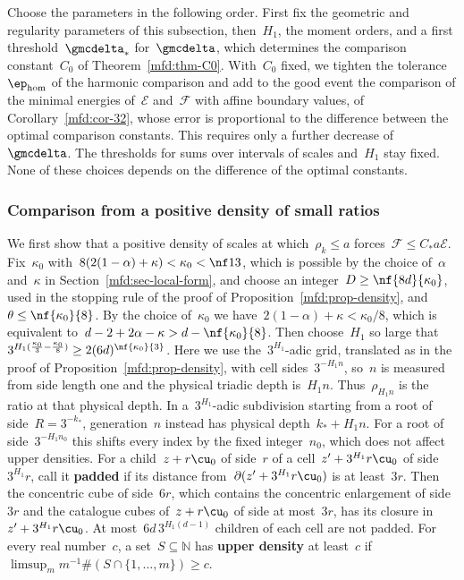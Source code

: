\documentclass[11pt]{amsart}
\begin{document}
\smallskip

Choose the parameters in the following order. First fix the geometric and regularity parameters of this subsection, then~$H_1$, the moment orders, and a first threshold~$\gmcdelta_*$ for~$\gmcdelta$, which determines the comparison constant~$C_0$ of Theorem~\ref{mfd:thm-C0}. With~$C_0$ fixed, we tighten the tolerance~$\ep_{\rm hom}$ of the harmonic comparison and add to the good event the comparison of the minimal energies of~$\mathscr E$ and~$\mathscr F$ with affine boundary values, of Corollary~\ref{mfd:cor-32}, whose error is proportional to the difference between the optimal comparison constants. This requires only a further decrease of~$\gmcdelta$. The thresholds for sums over intervals of scales and~$H_1$ stay fixed. None of these choices depends on the difference of the optimal constants.

\subsubsection{Comparison from a positive density of small ratios}

We first show that a positive density of scales at which~$\rho_k\leq a$ forces~$\mathscr F\leq C_*a\mathscr E$. Fix~$\kappa_0$ with~$8(2(1-\alpha)+\kappa)<\kappa_0<\nf13$, which is possible by the choice of~$\alpha$ and~$\kappa$ in Section~\ref{mfd:sec-local-form}, and choose an integer~$D\geq\nf{8d}{\kappa_0}$, used in the stopping rule of the proof of Proposition~\ref{mfd:prop-density}, and~$\theta\leq\nf{\kappa_0}{8}$. By the choice of~$\kappa_0$ we have~$2(1-\alpha)+\kappa<\kappa_0/8$, which is equivalent to~$d-2+2\alpha-\kappa>d-\nf{\kappa_0}{8}$. Then choose~$H_1$ so large that~$3^{H_1(\frac{\kappa_0}{3}-\frac{\kappa_0}{8})}\geq2(6d)^{\nf{\kappa_0}{3}}$. Here we use the~$3^{H_1}$-adic grid, translated as in the proof of Proposition~\ref{mfd:prop-density}, with cell sides~$3^{-H_1n}$, so~$n$ is measured from side length one and the physical triadic depth is~$H_1n$. Thus~$\rho_{H_1n}$ is the ratio at that physical depth. In a~$3^{H_1}$-adic subdivision starting from a root of side~$R=3^{-k_*}$, generation~$n$ instead has physical depth~$k_*+H_1n$. For a root of side~$3^{-H_1n_0}$ this shifts every index by the fixed integer~$n_0$, which does not affect upper densities. For a child~$z+r\cu_0$ of side~$r$ of a cell~$z'+3^{H_1}r\cu_0$ of side~$3^{H_1}r$, call it \textbf{padded} if its distance from~$\partial(z'+3^{H_1}r\cu_0)$ is at least~$3r$. Then the concentric cube of side~$6r$, which contains the concentric enlargement of side~$3r$ and the catalogue cubes of~$z+r\cu_0$ of side at most~$3r$, has its closure in~$z'+3^{H_1}r\cu_0$. At most~$6d\,3^{H_1(d-1)}$ children of each cell are not padded. For every real number~$c$, a set~$S\subseteq\mathbb N$ has \textbf{upper density} at least~$c$ if~$\limsup_mm^{-1}\#(S\cap\{1,\ldots,m\})\geq c$.
\end{document}
